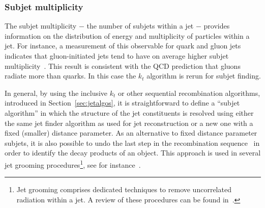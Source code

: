 \subsubsection{Subjet multiplicity} 

The subjet multiplicity $-$ the number of subjets within a jet $-$ provides information on the distribution of energy and multiplicity of particles within a jet.  For instance, a measurement of this observable for quark and gluon jets indicates that gluon-initiated jets tend to have on average higher subjet multiplicity~\cite{Snihur1999494}. %
This result is consistent with the QCD prediction that gluons radiate more than quarks. In this case %
the $k_t$ algorithm is rerun for subjet finding.

In general, by using the inclusive $k_t$ or  other sequential recombination algorithms, introduced in Section~\ref{sec:jetalgos}, it is straightforward to define a ``subjet algorithm'' in which the structure of the jet constituents is resolved using either the same jet finder algorithm as used for jet reconstruction or a new one with a fixed (smaller) distance parameter. 
As an alternative to fixed distance parameter subjets, it is also possible to undo the last step in the recombination sequence~\cite{kt2} in order to identify the decay products of an object.  This approach is used in several jet grooming procedures\footnote{Jet grooming comprises dedicated techniques to remove uncorrelated radiation within a jet. A review of these procedures can be found in~\cite{Abdesselam:2010pt}. }, see for instance~\cite{pruning}.


